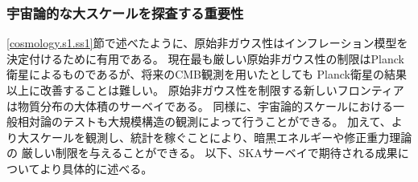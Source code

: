 \subsubsection{宇宙論的な大スケールを探査する重要性}

%
\ref{cosmology.s1.ss1}節で述べたように、原始非ガウス性はインフレーション模型を決定付けるために有用である。
現在最も厳しい原始非ガウス性の制限はPlanck衛星によるものであるが、将来のCMB観測を用いたとしても
Planck衛星の結果以上に改善することは難しい。
原始非ガウス性を制限する新しいフロンティアは物質分布の大体積のサーベイである。
%
同様に、宇宙論的スケールにおける一般相対論のテストも大規模構造の観測によって行うことができる。
加えて、より大スケールを観測し、統計を稼ぐことにより、暗黒エネルギーや修正重力理論の
厳しい制限を与えることができる。
以下、SKAサーベイで期待される成果についてより具体的に述べる。

